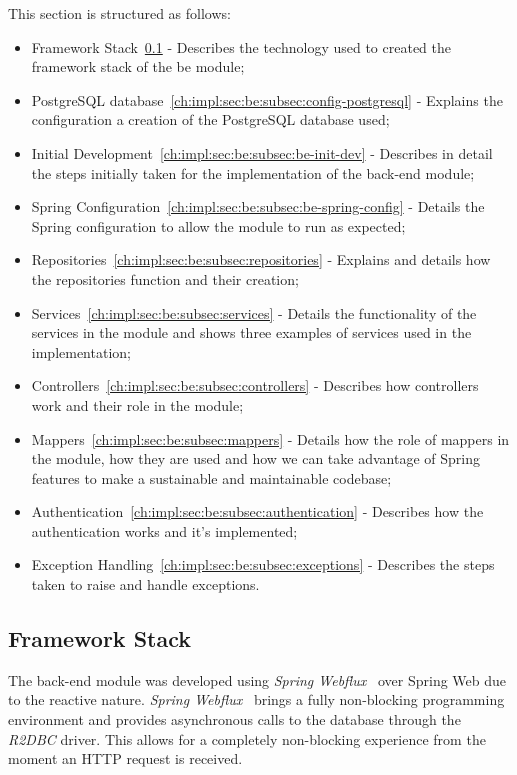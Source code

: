 This section is structured as follows:
\begin{itemize}
    \item Framework Stack~\ref{ch:impl:sec:be:subsec:be-module-dev} - Describes the technology used to created the framework stack of the \acrshort{be} module;
    \item PostgreSQL database~\ref{ch:impl:sec:be:subsec:config-postgresql} - Explains the configuration a creation of the PostgreSQL database used;
    \item Initial Development~\ref{ch:impl:sec:be:subsec:be-init-dev} - Describes in detail the steps initially taken for the implementation of the back-end module;
    \item Spring Configuration~\ref{ch:impl:sec:be:subsec:be-spring-config} - Details the Spring configuration to allow the module to run as expected;
    \item Repositories~\ref{ch:impl:sec:be:subsec:repositories} - Explains and details how the repositories function and their creation;
    \item Services~\ref{ch:impl:sec:be:subsec:services} - Details the functionality of the services in the module and shows three examples of services used in the implementation;
    \item Controllers~\ref{ch:impl:sec:be:subsec:controllers} - Describes how controllers work and their role in the module;
    \item Mappers~\ref{ch:impl:sec:be:subsec:mappers} - Details how the role of mappers in the module, how they are used and how we can take advantage of Spring features to make a sustainable and maintainable codebase;
    \item Authentication~\ref{ch:impl:sec:be:subsec:authentication} - Describes how the authentication works and it's implemented;
    \item Exception Handling~\ref{ch:impl:sec:be:subsec:exceptions} - Describes the steps taken to raise and handle exceptions.
\end{itemize}


\subsection{Framework Stack}\label{ch:impl:sec:be:subsec:be-module-dev}

The back-end module was developed using \textit{Spring Webflux}~\cite{spring-webflux} over Spring Web due to the reactive nature. \textit{Spring Webflux}~\cite{spring-webflux} brings a fully non-blocking programming environment and provides asynchronous calls to the database through the \textit{R2DBC} driver. This allows for a completely non-blocking experience from the moment an HTTP request is received. 

